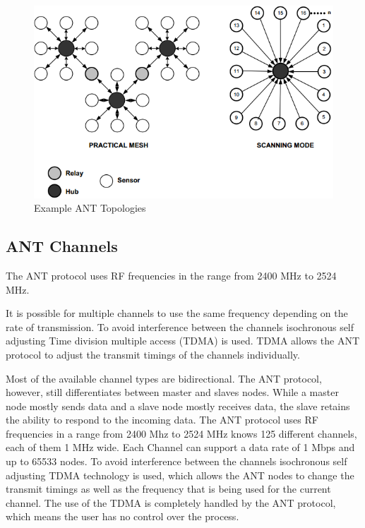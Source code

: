 \begin{figure}[H]
	\centering
	\includegraphics[scale=0.7]{content/images/ANTtopo.png}
	\caption{Example ANT Topologies\cite{DynastreamInnovationsInc.2013}}\label{fig:anttopo}
\end{figure}

\subsection{ANT Channels}
The ANT protocol uses RF frequencies in the range from 2400 MHz to 2524 MHz. 

It is possible for multiple channels to use the same frequency depending on the rate of transmission. To avoid interference between the channels isochronous self adjusting Time division multiple access (TDMA) is used. TDMA allows the ANT protocol to adjust the transmit timings of the channels individually.



Most of the available channel types are bidirectional. The ANT protocol, however, still differentiates between master and slaves nodes. While a master node mostly sends data and a slave node mostly receives data, the slave retains the ability to respond to the incoming data.
The ANT protocol uses RF frequencies in a range from 2400 Mhz to 2524 MHz knows 125 different channels, each of them 1 MHz wide. Each Channel can support a data rate of 1 Mbps and up to 65533 nodes. To avoid interference between the channels isochronous self adjusting TDMA technology is used, which allows the ANT nodes to change the transmit timings as well as the frequency that is being used for the current channel. The use of the TDMA is completely handled by the ANT protocol, which means the user has no control over the process.

